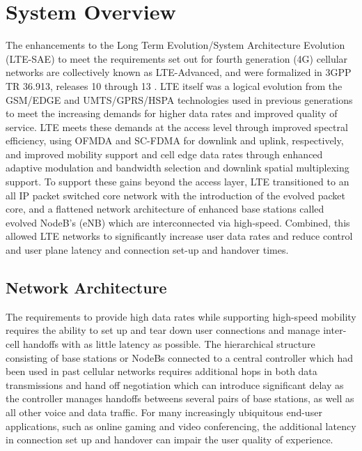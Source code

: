 \section{System Overview}
\label{sys-overview}%
The enhancements to the Long Term Evolution/System Architecture Evolution (LTE-SAE) to meet the requirements set out for fourth generation (4G) cellular networks are collectively known as LTE-Advanced, and were formalized in 3GPP TR 36.913, releases 10 through 13 \cite{tr36913}.  LTE itself was a logical evolution from the GSM/EDGE and UMTS/GPRS/HSPA technologies used in previous generations to meet the increasing demands for higher data rates and improved quality of service. LTE meets these demands at the access level through improved spectral efficiency, using OFMDA and SC-FDMA for downlink and uplink, respectively, and improved mobility support and cell edge data rates through enhanced adaptive modulation and bandwidth selection and downlink spatial multiplexing support. To support these gains beyond the access layer, LTE transitioned to an all IP packet switched core network with the introduction of the evolved packet core, and a flattened network architecture of enhanced base stations called evolved NodeB's (eNB) which are interconnected via high-speed.  Combined, this allowed LTE networks to significantly increase user data rates and reduce control and user plane latency and connection set-up and handover times.  

\subsection{Network Architecture}
\label{net-arch}
The requirements to provide high data rates while supporting high-speed mobility requires the ability to set up and tear down user connections and manage inter-cell handoffs with as little latency as possible.  The hierarchical structure consisting of base stations or NodeBs connected to a central controller which had been used in past cellular networks requires additional hops in both data transmissions and hand off negotiation which can introduce significant delay as the controller manages handoffs betweens several pairs of base stations, as well as all other voice and data traffic.  For many increasingly ubiquitous end-user applications, such as online gaming and video conferencing, the additional latency in connection set up and handover can impair the user quality of experience.  


